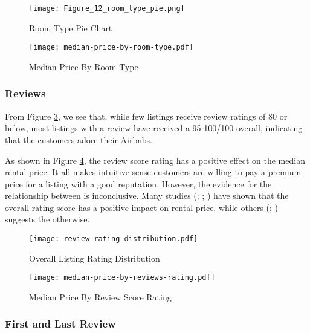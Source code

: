 \begin{figure}[!htbp]
    \centering
        \centering
        \texttt{[image: Figure\_12\_room\_type\_pie.png]}
        \caption{Room Type Pie Chart}
        \label{fig:room_type_pie}
\end{figure}

\begin{figure}[!htbp]
        \centering
        \texttt{[image: median-price-by-room-type.pdf]}
        \caption{Median Price By Room Type}
        \label{fig:room_type_price}
\end{figure}

\subsubsection*{Reviews}

From Figure   \ref{fig:overall-listing}, we see that, while few listings receive
review ratings of 80 or below, most listings with a review have received a
95-100/100 overall,  indicating that the customers adore their Airbnbs.


As shown in Figure \ref{fig:price_by_review_score_rating}, the review score
rating has a positive effect on the median rental price. It all makes intuitive
sense customers are willing to pay a premium price for a listing with a good
reputation.  However, the evidence for the relationship between is inconclusive.
Many studies (\cite{chen2017consumer}; \cite{gibbs2018use};
\cite{wang2017price}) have shown that the overall rating score has a positive
impact on rental price, while others (\cite{li2016pros}; \cite{zhang2017key})
suggests the otherwise.

\begin{figure}[!htbp]\centering
    \texttt{[image: review-rating-distribution.pdf]}
    \caption{Overall Listing Rating Distribution}
    \label{fig:overall-listing}
\end{figure}

\begin{figure}[!htbp]\centering
    \texttt{[image: median-price-by-reviews-rating.pdf]}
    \caption{Median Price By Review Score Rating}
    \label{fig:price_by_review_score_rating}
\end{figure}

\subsubsection*{First and Last Review}

